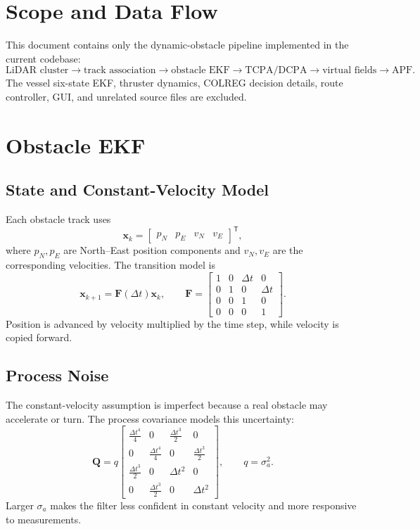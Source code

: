 \documentclass[11pt,a4paper]{article}
\begin{document}
\section{Scope and Data Flow}
This document contains only the dynamic-obstacle pipeline implemented in the current codebase:
\[
\text{LiDAR cluster}\rightarrow\text{track association}\rightarrow\text{obstacle EKF}\rightarrow\text{TCPA/DCPA}\rightarrow\text{virtual fields}\rightarrow\text{APF}.
\]
The vessel six-state EKF, thruster dynamics, COLREG decision details, route controller, GUI, and unrelated source files are excluded.

\section{Obstacle EKF}

\subsection{State and Constant-Velocity Model}
Each obstacle track uses
\[
\bm{x}_k=\begin{bmatrix}p_N&p_E&v_N&v_E\end{bmatrix}^{\mathsf T},
\]
where \(p_N,p_E\) are North--East position components and \(v_N,v_E\) are the corresponding velocities. The transition model is
\[
\bm{x}_{k+1}=\bm{F}(\Delta t)\bm{x}_k,
\qquad
\bm{F}=\begin{bmatrix}1&0&\Delta t&0\\0&1&0&\Delta t\\0&0&1&0\\0&0&0&1\end{bmatrix}.
\]
Position is advanced by velocity multiplied by the time step, while velocity is copied forward.

\subsection{Process Noise}
The constant-velocity assumption is imperfect because a real obstacle may accelerate or turn. The process covariance models this uncertainty:
\[
\bm{Q}=q\begin{bmatrix}
\frac{\Delta t^4}{4}&0&\frac{\Delta t^3}{2}&0\\
0&\frac{\Delta t^4}{4}&0&\frac{\Delta t^3}{2}\\
\frac{\Delta t^3}{2}&0&\Delta t^2&0\\
0&\frac{\Delta t^3}{2}&0&\Delta t^2
\end{bmatrix},\qquad q=\sigma_a^2.
\]
Larger \(\sigma_a\) makes the filter less confident in constant velocity and more responsive to measurements.
\end{document}
